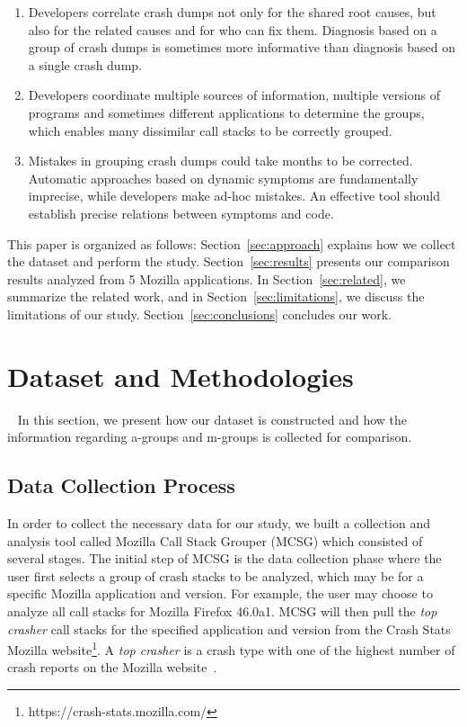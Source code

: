 \documentclass{llncs}
\begin{document}
\begin{enumerate}
\item Developers correlate crash dumps not only for the shared root causes, but also for the related causes and for who can fix them. Diagnosis based on a group of crash dumps is sometimes more informative than diagnosis based on a single crash dump.
\item Developers coordinate multiple sources of information, multiple versions of programs and sometimes different applications to determine the groups, which enables many dissimilar call stacks to be correctly grouped.
\item Mistakes in grouping crash dumps could take months to be corrected. Automatic approaches based on dynamic symptoms are fundamentally imprecise, while developers make ad-hoc mistakes. An effective tool should establish precise relations between symptoms and code.
\end{enumerate}


This paper is organized as follows: Section~\ref{sec:approach} explains how we collect the dataset and perform the study. Section~\ref{sec:results} presents our comparison results analyzed from 5 Mozilla applications. In Section~\ref{sec:related}, we summarize the related work, and in Section~\ref{sec:limitations}, we discuss the limitations of our study. Section~\ref{sec:conclusions} concludes our work.

\section{Dataset and Methodologies}~\label{sec:approach}
In this section, we present how our dataset is constructed and how the information regarding a-groups and m-groups is collected for comparison.

\subsection{Data Collection Process}
In order to collect the necessary data for our study, we built a collection and analysis tool called Mozilla Call Stack Grouper (MCSG) which consisted of several stages. The initial step of MCSG is the data collection phase where the user first selects a group of crash stacks to be analyzed, which may be for a specific Mozilla application and version. For example, the user may choose to analyze all call stacks for Mozilla  Firefox 46.0a1. MCSG will then pull the \emph{top crasher} call stacks for the specified application and version from the Crash Stats Mozilla website\footnote{https://crash-stats.mozilla.com/}. A \emph{top crasher} is a crash type with one of the highest number of crash reports on the Mozilla website~\cite{Dhaliwal:2011:CFC:2117694.2119726}. %
\end{document}
